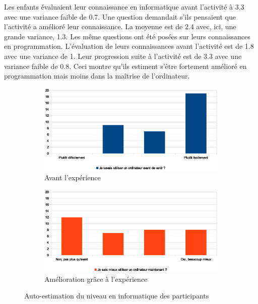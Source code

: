 Les enfants évaluaient leur connaissance en informatique avant l'activité à 3.3 avec une variance faible de 0.7. Une question demandait s'ils pensaient que l'activité a amélioré leur connaissance. La moyenne est de 2.4 avec, ici, une grande variance, 1.3.
Les même questions ont été posées sur leurs connaissances en programmation. L'évaluation de leurs connaissances avant l'activité est de 1.8 avec une variance de 1. Leur progression suite à l'activité est de 3.3 avec une variance faible de 0.8. Ceci montre qu'ils estiment s'être fortement amélioré en programmation mais moins dans la maîtrise de l'ordinateur.


\begin{figure}
  \begin{center}
    \begin{subfigure}[b]{\textwidth}
      \includegraphics[width=\textwidth]{content/8-validation/images/ordi-avant}
      \caption{Avant l'expérience}
    \end{subfigure}
    \begin{subfigure}[b]{\textwidth}
      \includegraphics[width=\textwidth]{content/8-validation/images/ordi-apres}
      \caption{Amélioration grâce à l'expérience}
    \end{subfigure}
    \caption{Auto-estimation du niveau en informatique des participants}
    \label{fig:niveau-info}
  \end{center}
\end{figure}
